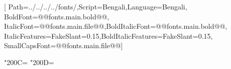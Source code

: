 \newcommand*{\ollangid}{bn}
\newcommand*{\ollanguage}{bengali}
\usepackage{fontspec}
\setmainfont{@@fonts.main.name@@}
\setsansfont{@@fonts.sans.name@@}
\setmonofont{@@fonts.mono.name@@}
\newfontfamily{}
\newfontfamily{}[
  Path=../../../../fonts/,Script=Bengali,Language=Bengali,
  BoldFont=@@fonts.main.bold@@,
  ItalicFont=@@fonts.main.file@@,BoldItalicFont=@@fonts.main.bold@@,
  ItalicFeatures={FakeSlant=0.15},BoldItalicFeatures={FakeSlant=0.15},
  SmallCapsFont=@@fonts.main.file@@]
\usepackage[Bengali,DevanagariDanDa,BasicLatin,GeneralPunctuation]{ucharclasses}
\XeTeXcharclass"200C=\BengaliClass
\XeTeXcharclass"200D=\BengaliClass
{}
\usepackage[nonumberlist,toc,style=index]{glossaries}
\makeglossaries
